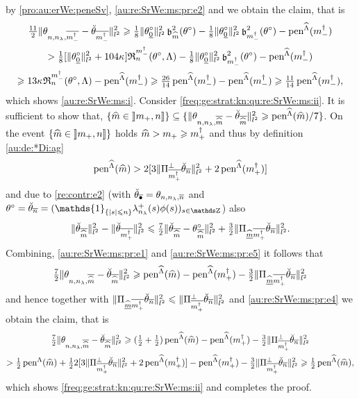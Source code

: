 \begin{pro}
  by \eqref{pro:au:erWe:peneSv},  \eqref{au:re:SrWe:ms:pr:e2}
  and  we obtain the claim, that is
  \begin{multline*}
    \tfrac{11}{2}\Vnormlp{\hxdfPr[\mdDi]-\dxdfPr[\mdDi]}^2\geq
    \tfrac{1}{8}\Vnormlp{\xdf_{\underline{0}}}^2\bias[\hDi]^2(\xdf)-
    \tfrac{1}{8}\Vnormlp{\xdf_{\underline{0}}}^2\bias[\mdDi]^2(\xdf)
    -\peneSv[(\mdDi)]\\
    >\tfrac{1}{8}[\Vnormlp{\xdf_{\underline{0}}}^2+104\cpen]\daRa{\mdDi}{(\xdf,\Lambda)}
    -\tfrac{1}{8}\Vnormlp{\xdf_{\underline{0}}}^2\bias[\mdDi]^2(\xdf)-\peneSv[(\mdDi)]\\
    \geq 13\cpen \daRa{\mdDi}{(\xdf,\Lambda)}-\peneSv[(\mdDi)]\geq\tfrac{26}{14}\peneSv[(\mdDi)]-\peneSv[(\mdDi)]  \geq\tfrac{11}{14}\peneSv[(\mdDi)],
  \end{multline*}
which  shows \ref{au:re:SrWe:ms:i}.  Consider \ref{freq:ge:strat:kn:qu:re:SrWe:ms:ii}. It is sufficient to show that,
  $\{\hDi\in\nsetlo{\pDi,\ssY}\}\subseteq
  \{\Vnormlp{\hxdfPr[\hDi]-\dxdfPr[\hDi]}^2\geq\peneSv[(\hDi)]/7\}$.  On the
  event $\{\hDi\in\nsetlo{\pDi,\ssY}\}$ holds $\hDi>\pDi\geq\pdDi$ and
  thus by definition \eqref{au:de:*Di:ag}
  \begin{equation}\label{au:re:SrWe:ms:pr:e4}
    \peneSv[(\hDi)] > 2[3\Vnormlp{\ProjC[\pdDi]\dxdfPr[\ssY]}^2+2\peneSv[(\pdDi)]]
  \end{equation}
  and due to  \ref{re:contr:e2} 
(with
$\dxdfPr[\bullet]=\hxdfPr[\ssY]$
and
$\xdf=\dxdfPr[\ssY]=(\mathds{1}_{\{\vert s \vert \leq n\}}\hfedfmpI[(s)]\fydf[(s)])_{s \in \Z}$)
also
\begin{equation}\label{au:re:SrWe:ms:pr:e5}
  \Vnormlp{\dxdfPr[\hDi]}^2-\Vnormlp{\dxdfPr[\pdDi]}^2\leq
  \tfrac{7}{2}\Vnormlp{\dxdfPr[\hDi]-\xdfPr[\hDi]}^2+\tfrac{3}{2}\Vnormlp{\dProj{\pdDi}{\hDi}\dxdfPr[\ssY]}^2.
  \end{equation}
  Combining, \eqref{au:re:SrWe:ms:pr:e1} and \eqref{au:re:SrWe:ms:pr:e5} it
  follows that
  \begin{multline*}
    \tfrac{7}{2}\Vnormlp{\hxdfPr[\hDi]-\dxdfPr[\hDi]}^2\geq
    \peneSv[(\hDi)]-\peneSv[(\pdDi)]  -\tfrac{3}{2}\Vnormlp{\dProj{\pdDi}{\hDi}\dxdfPr[\ssY]}^2\hfill
  \end{multline*}
  and hence together with
  $\Vnormlp{\dProj{\pdDi}{\hDi}\dxdfPr[\ssY]}^2\leq\Vnormlp{\ProjC[\pdDi]\dxdfPr[\ssY]}^2$ and
  \eqref{au:re:SrWe:ms:pr:e4} we obtain the claim,
  that is
  \begin{multline*}
    \tfrac{7}{2}\Vnormlp{\hxdfPr[\hDi]-\dxdfPr[\hDi]}^2\geq
    (\tfrac{1}{2}+\tfrac{1}{2})\peneSv[(\hDi)]-\peneSv[(\pdDi)]  -\tfrac{3}{2}\Vnormlp{\ProjC[\pdDi]\dxdfPr[\ssY]}^2\\
    >\tfrac{1}{2}\penSv[\hDi]+\tfrac{1}{2}2[3\Vnormlp{\ProjC[\pdDi]\dxdfPr[\ssY]}^2+2\peneSv[(\pdDi)]]-\peneSv[(\pdDi)]-\tfrac{3}{2}\Vnormlp{\ProjC[\pdDi]\dxdfPr[\ssY]}^2
    \geq\tfrac{1}{2}\peneSv[(\hDi)],
  \end{multline*}
  which shows \ref{freq:ge:strat:kn:qu:re:SrWe:ms:ii} and completes the proof.\proEnd
\end{pro}

